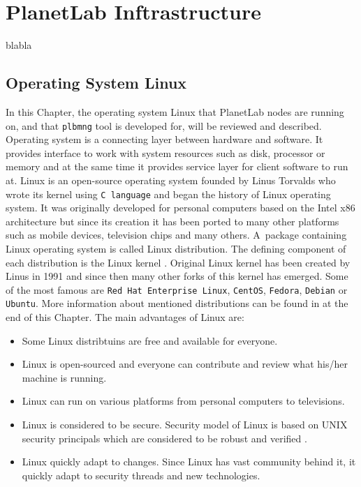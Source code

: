 \section{PlanetLab Inftrastructure}
\label{section:plinfra}

blabla

\subsection{Operating System Linux}
\label{subsection:Linux}
In this Chapter, the operating system Linux that PlanetLab nodes are running on, and that \texttt{plbmng} tool is developed for, will be reviewed and described. Operating system is a connecting layer between hardware and software. It provides interface to work with system resources such as disk, processor or memory and at the same time it provides service layer for client software to run at. Linux is an open-source operating system founded by Linus Torvalds who wrote its kernel using \texttt{C language} and began the history of Linux operating system. It was originally developed for personal computers based on the Intel x86 architecture but since its creation it has been ported to many other platforms such as mobile devices, television chips and many others. A~package containing Linux operating system is called Linux distribution. The defining component of each distribution is the Linux kernel \cite{eckert2012linux+}. Original Linux kernel has been created by Linus in 1991 \cite{linuxintro} and since then many other forks of this kernel has emerged. Some of the most famous are \texttt{Red Hat Enterprise Linux},  \texttt{CentOS}, \texttt{Fedora}, \texttt{Debian} or \texttt{Ubuntu}. More information about mentioned distributions can be found in at the end of this Chapter. The main advantages of Linux are:
\begin{itemize}
	\item Some Linux distribtuins are free and available for everyone.
	\item Linux is open-sourced and everyone can contribute and review what his/her machine is running.
	\item Linux can run on various platforms from personal computers to televisions.
	\item Linux is considered to be secure. Security model of Linux is based on UNIX security principals which are considered to be robust and verified \cite{BILHEQP2xqVnjbQi}. 
	\item Linux quickly adapt to changes. Since Linux has vast community behind it, it quickly adapt to security threads and new technologies.
\end{itemize}
